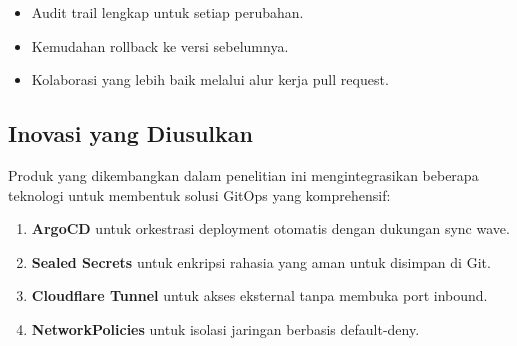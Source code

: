 \begin{itemize}
    \item Audit trail lengkap untuk setiap perubahan.
    \item Kemudahan rollback ke versi sebelumnya.
    \item Kolaborasi yang lebih baik melalui alur kerja pull request.
\end{itemize}

\subsection{Inovasi yang Diusulkan}

Produk yang dikembangkan dalam penelitian ini mengintegrasikan beberapa teknologi untuk membentuk solusi GitOps yang komprehensif:

\begin{enumerate}
    \item \textbf{ArgoCD} untuk orkestrasi deployment otomatis dengan dukungan sync wave.
    \item \textbf{Sealed Secrets} untuk enkripsi rahasia yang aman untuk disimpan di Git.
    \item \textbf{Cloudflare Tunnel} untuk akses eksternal tanpa membuka port inbound.
    \item \textbf{NetworkPolicies} untuk isolasi jaringan berbasis default-deny.
\end{enumerate}
